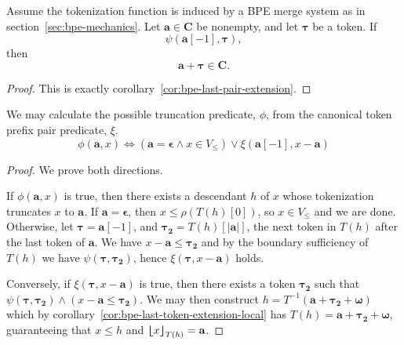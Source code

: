 \begin{corollary}
    \label{cor:bpe-last-token-extension-local}
    Assume the tokenization function is induced by a BPE merge system as in
    section~\ref{sec:bpe-mechanics}. Let $\mathbf{a} \in \mathbf{C}$ be nonempty,
    and let $\boldsymbol{\tau}$ be a token. If
    \[
    \psi(\mathbf{a}[-1], \boldsymbol{\tau}),
    \]
    then
    \[
    \mathbf{a}+\boldsymbol{\tau} \in \mathbf{C}.
    \]
\end{corollary}
\begin{proof}
    This is exactly corollary~\ref{cor:bpe-last-pair-extension}.
\end{proof}
\begin{theorem}
    We may calculate the possible truncation predicate, $\phi$, from the canonical token prefix pair predicate, $\xi$.
    $$
    \phi(\mathbf{a}, x)
    \iff
    \left( \mathbf{a} = \mathbf{\epsilon} \land x \in V_{\leq} \right)
    \lor
    \xi(\mathbf{a}[-1], x - \mathbf{a})
    $$
\end{theorem}
\begin{proof}
    We prove both directions.
    
    If $\phi(\mathbf{a}, x)$ is true, then there exists a descendant $h$ of $x$
    whose tokenization truncates $x$ to $\mathbf{a}$.
    If $\mathbf{a} = \mathbf{\epsilon}$, then $x \leq \rho(T(h)[0])$, so $x \in V_{\leq}$ and we are done.
    Otherwise, let $\boldsymbol{\tau} = \mathbf{a}[-1]$, and
    $\boldsymbol{\tau_2} = T(h)[|\mathbf{a}|]$, the next token in $T(h)$ after the last token of $\mathbf{a}$.
    We have $x - \mathbf{a} \leq \boldsymbol{\tau_2}$ and by the boundary sufficiency of $T(h)$ we have $\psi(\boldsymbol{\tau}, \boldsymbol{\tau_2})$,
    hence $\xi(\boldsymbol{\tau}, x - \mathbf{a})$ holds.

    Conversely, if $\xi(\boldsymbol{\tau}, x - \mathbf{a})$ is true, then there exists a token $\boldsymbol{\tau_2}$ such that $\psi(\boldsymbol{\tau}, \boldsymbol{\tau_2}) \land (x - \mathbf{a} \leq \boldsymbol{\tau_2})$.
    We may then construct $h = T^{-1}(\mathbf{a} + \boldsymbol{\tau_2} + \boldsymbol{\omega})$
    which by corollary~\ref{cor:bpe-last-token-extension-local} has $T(h) = \mathbf{a} + \boldsymbol{\tau_2} + \boldsymbol{\omega}$,
    guaranteeing that $x \leq h$ and ${\bm{\lfloor}} x {\bm{\rfloor}}_{T(h)} = \mathbf{a}$.

\end{proof}

